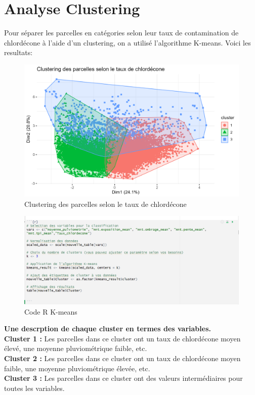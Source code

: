 \documentclass{report}
\begin{document}
\section*{Analyse Clustering}

Pour séparer les parcelles en catégories selon leur taux de contamination de chlordécone à l'aide d'un clustering, on a utilisé l'algorithme K-means. Voici les resultats: \\

\begin{figure}[H]
\centering
\includegraphics[width = 1
\linewidth]{clusters_parcelles.png}
\caption{Clustering des parcelles selon le taux de chlordécone}
\end{figure}

\begin{figure}[H]
\centering
\includegraphics[width = 1
\linewidth]{codecluster1.png}
\caption{Code R K-means}
\end{figure}

\Large\textbf{Une descrption de chaque cluster en termes des variables.}\\
\large\textbf{Cluster 1 :} Les parcelles dans ce cluster ont un taux de chlordécone moyen élevé, une moyenne pluviométrique faible, etc.\\
\large\textbf{Cluster 2 :} Les parcelles dans ce cluster ont un taux de chlordécone moyen faible, une moyenne pluviométrique élevée, etc.\\
\large\textbf{Cluster 3 :} Les parcelles dans ce cluster ont des valeurs intermédiaires pour toutes les variables.\\
\end{document}

